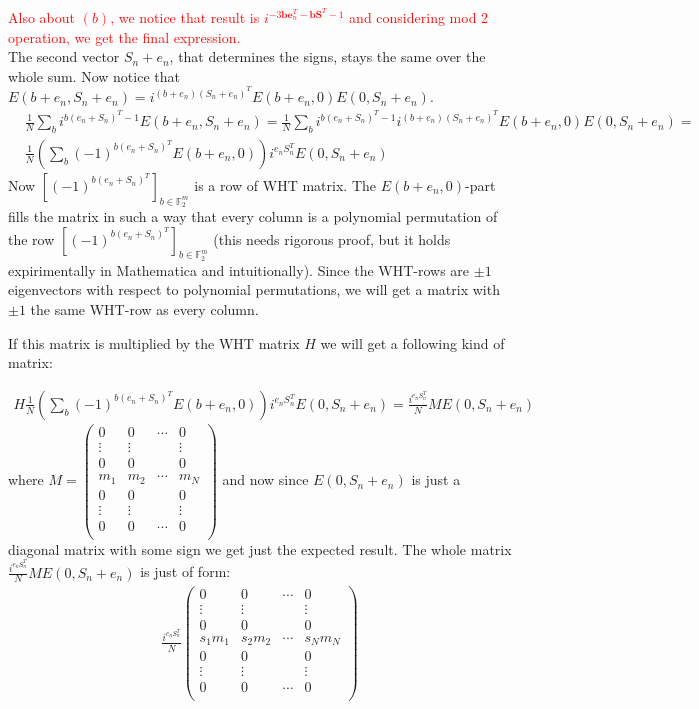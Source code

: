 \documentclass{article}
\begin{document}
\textcolor{red}{
Also about $(b)$, we notice that result is $i^{-3 \mathbf{b}\mathbf{e}_n^T-\mathbf{b}\mathbf{S}^T-1}$ and considering mod 2 operation, we get the final expression.
}
\\

	The second vector $S_n+e_n$, that determines the signs, stays the same over the whole sum. Now notice that $E(b+e_n, S_n + e_n) = i^{(b+e_n)(S_n+e_n)^T}E(b + e_n, 0)E(0,S_n + e_n)$.
	\begin{align*}
		&\frac{1}{N} \sum_{b} i^{b(e_n + S_n)^T - 1}E(b+e_n,S_n+e_n)
		= \frac{1}{N} \sum_{b} i^{b(e_n + S_n)^T-1}i^{(b+e_n)(S_n+e_n)^T}E(b + e_n, 0)E(0,S_n + e_n) = \\ &\frac{1}{N} \left(\sum_{b} (-1)^{b(e_n+S_n)^T} E(b+e_n, 0) \right) i^{e_nS_n^T}E(0, S_n + e_n)
	\end{align*}
	Now 
	$\left[(-1)^{b(e_n+S_n)^T}\right]_{b \in \mathbb{F}_2^m}$ is a row of WHT matrix. 
	The $E(b+e_n,0)$-part fills the matrix in such a way that every column is a polynomial permutation of the row $\left[(-1)^{b(e_n+S_n)^T}\right]_{b \in \mathbb{F}_2^m}$ (this needs rigorous proof, but it holds expirimentally in Mathematica and intuitionally). Since the WHT-rows are $\pm 1$ eigenvectors with respect to polynomial permutations, we will get a matrix with $\pm 1$ the same WHT-row as every column. \newpage 
	
	If this matrix is multiplied by the WHT matrix $H$ we will get a following kind of matrix:
	
	\begin{align*}
		H \frac{1}{N} \left(\sum_{b} (-1)^{b(e_n+S_n)^T} E(b+e_n, 0) \right) i^{e_nS_n^T}E(0, S_n + e_n) = \frac{i^{e_nS_n^T}}{N}ME(0, S_n + e_n)
	\end{align*}
	where $M = \begin{pmatrix} 0 & 0 & \cdots & 0 \\
		\vdots & \vdots &  & \vdots \\
		0 & 0 &  & 0 \\
		m_1 & m_2 & \cdots & m_N \\
		0 & 0 & & 0 \\
		\vdots & \vdots &  & \vdots \\
		0 & 0 & \cdots & 0 \\
	\end{pmatrix}$ and now since $E(0, S_n + e_n)$ is just a diagonal matrix with some sign we get just the expected result. The whole matrix $\frac{i^{e_nS_n^T}}{N}ME(0, S_n + e_n)$ is just of form:
	\begin{align*}
		\frac{i^{e_nS_n^T}}{N} \begin{pmatrix} 0 & 0 & \cdots & 0 \\
			\vdots & \vdots &  & \vdots \\
			0 & 0 &  & 0 \\
			s_1m_1 & s_2m_2 & \cdots & s_Nm_N \\
			0 & 0 & & 0 \\
			\vdots & \vdots &  & \vdots \\
			0 & 0 & \cdots & 0 \\
		\end{pmatrix}
	\end{align*}
	
\end{document}
